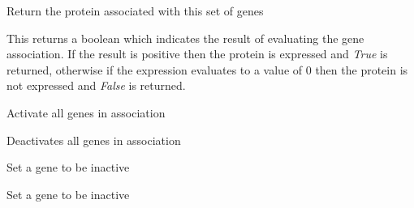 \documentclass[a4paper,11pt,english]{sphinxmanual}
\begin{document}
\begin{fulllineitems}
\begin{fulllineitems}
\label{modules_doc:cbmpy.CBModel.GeneProteinAssociation.getProtein}
Return the protein associated with this set of genes

\end{fulllineitems}


\begin{fulllineitems}
\label{modules_doc:cbmpy.CBModel.GeneProteinAssociation.isProteinActive}
This returns a boolean which indicates the result of evaluating the gene association. If the result is positive
then the protein is expressed and \emph{True} is returned, otherwise if the expression evaluates to a value of 0 then
the protein is not expressed and  \emph{False} is returned.

\end{fulllineitems}


\begin{fulllineitems}
\label{modules_doc:cbmpy.CBModel.GeneProteinAssociation.setAllGenesActive}
Activate all genes in association

\end{fulllineitems}


\begin{fulllineitems}
\label{modules_doc:cbmpy.CBModel.GeneProteinAssociation.setAllGenesInactive}
Deactivates all genes in association

\end{fulllineitems}


\begin{fulllineitems}
\label{modules_doc:cbmpy.CBModel.GeneProteinAssociation.setGeneActive}
Set a gene to be inactive

\end{fulllineitems}


\begin{fulllineitems}
\label{modules_doc:cbmpy.CBModel.GeneProteinAssociation.setGeneInactive}
Set a gene to be inactive

\end{fulllineitems}


\end{fulllineitems}
\end{document}
